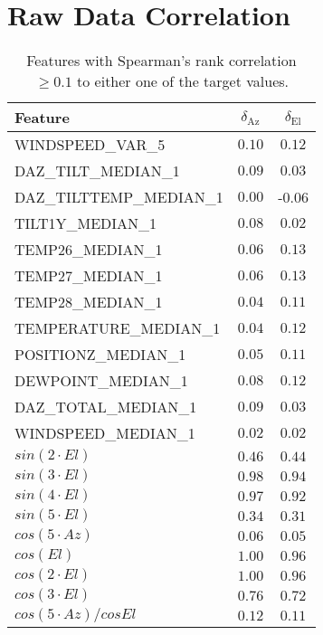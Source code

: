 \section{Raw Data Correlation}
\begin{table}[!htbp]
    \centering
    \caption{Features with Spearman's rank correlation $\geq 0.1$ to either one of the target values.}
    \begin{tabular}{lcc}
        \toprule
        Feature &  $\delta_{\text{Az}}$ &  $\delta_{\text{El}}$  \\
        \midrule
        WINDSPEED\_VAR\_5        &      $0.10$ &      $0.12$ \\
        DAZ\_TILT\_MEDIAN\_1      &      $0.09$ &      $0.03$\\
        DAZ\_TILTTEMP\_MEDIAN\_1  &      $0.00$ &     -$0.06$\\
        TILT1Y\_MEDIAN\_1        &      $0.08$ &      $0.02$ \\
        TEMP26\_MEDIAN\_1        &      $0.06$ &      $0.13$  \\
        TEMP27\_MEDIAN\_1        &      $0.06$ &      $0.13$  \\
        TEMP28\_MEDIAN\_1        &      $0.04$ &      $0.11$  \\
        TEMPERATURE\_MEDIAN\_1   &      $0.04$ &      $0.12$  \\
        POSITIONZ\_MEDIAN\_1     &      $0.05$ &      $0.11$  \\
        DEWPOINT\_MEDIAN\_1      &      $0.08$ &      $0.12$  \\
        DAZ\_TOTAL\_MEDIAN\_1     &      $0.09$ &      $0.03$\\
        WINDSPEED\_MEDIAN\_1     &      $0.02$ &      $0.02$ \\
        $sin(2\cdot El)$                  &      $0.46$ &      $0.44$  \\
        $sin(3\cdot El)$                  &      $0.98$ &      $0.94$  \\
        $sin(4\cdot El)$                  &      $0.97$ &      $0.92$  \\
        $sin(5\cdot El)$                  &      $0.34$ &      $0.31$  \\
        $cos(5\cdot Az)$                  &      $0.06$ &      $0.05$  \\
         $cos(El)$                        &      $1.00$ &      $0.96$  \\
         $cos(2\cdot El)$                 &      $1.00$ &      $0.96$  \\
         $cos(3\cdot El)$                 &      $0.76$ &      $0.72$  \\
         $cos(5\cdot Az)/cos El$             &      $0.12$ &      $0.11$ \\
        \bottomrule
    \end{tabular}
    \label{tab:raw_data_spearmans}
\end{table}

